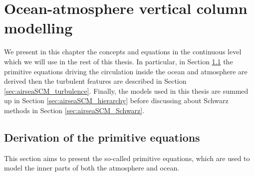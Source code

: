 \chapter{Ocean-atmosphere vertical column modelling}
\label{ch:airseaSCM}
\minitoc
We present in this chapter the concepts and equations in
the continuous level which
we will use in the rest of this thesis.
In particular, in Section \ref{sec:airseaSCM_primitiveEquations}
the primitive equations driving the circulation inside
the ocean and atmosphere are derived then
the turbulent features are described in Section
\ref{sec:airseaSCM_turbulence}.
Finally, the models used in this thesis are summed up
in Section \ref{sec:airseaSCM_hierarchy}
before discussing about Schwarz methods in Section
\ref{sec:airseaSCM_Schwarz}.
\section{Derivation of the primitive equations}
\label{sec:airseaSCM_primitiveEquations}
This section aims to present the so-called
primitive equations, which are used to model
the inner parts of both the atmosphere and ocean.
